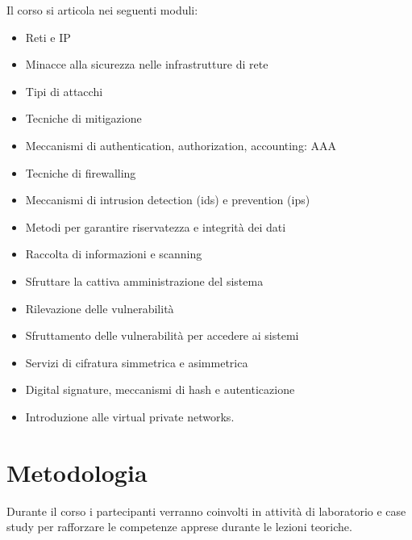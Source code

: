 Il corso si articola nei seguenti moduli:
\begin{itemize}
	
\item Reti e IP

\item Minacce alla sicurezza nelle infrastrutture di rete

\item Tipi di attacchi

\item Tecniche di mitigazione

\item Meccanismi di authentication, authorization, accounting: AAA

\item Tecniche di firewalling 

\item Meccanismi di intrusion detection (ids)  e prevention (ips) 

\item Metodi per garantire riservatezza e integrità dei dati

\item Raccolta di informazioni e scanning

\item Sfruttare la cattiva amministrazione del sistema

\item Rilevazione delle vulnerabilità 

\item Sfruttamento delle vulnerabilità per accedere ai sistemi

\item Servizi di cifratura  simmetrica e asimmetrica

\item Digital signature, meccanismi di hash e autenticazione

\item Introduzione alle virtual private networks.

\end{itemize}
	
\section{Metodologia}

Durante il corso i partecipanti verranno coinvolti in attività di laboratorio e case study per rafforzare
le competenze apprese durante le lezioni teoriche.
